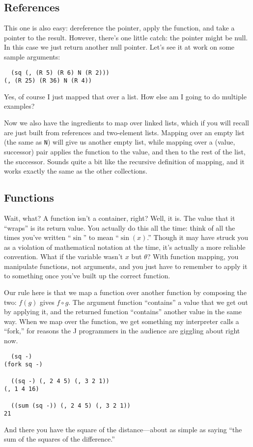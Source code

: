 \documentclass{article}
\newcommand{\code}[1]{\lstinline`#1`}
\begin{document}
\subsection{References}
This one is also easy: dereference the pointer, apply the function, and take a pointer to the result. However, there's one little catch: the pointer might be null. In this case we just return another null pointer. Let's see it at work on some sample arguments:
\begin{lstlisting}
  (sq (, (R 5) (R 6) N (R 2)))
(, (R 25) (R 36) N (R 4))
\end{lstlisting}
Yes, of course I just mapped that over a list. How else am I going to do multiple examples?

Now we also have the ingredients to map over linked lists, which if you will recall are just built from references and two-element lists. Mapping over an empty list (the same as \code{N}) will give us another empty list, while mapping over a (value, successor) pair applies the function to the value, and then to the rest of the list, the successor. Sounds quite a bit like the recursive definition of mapping, and it works exactly the same as the other collections.

\subsection{Functions}
Wait, what? A function isn't a container, right? Well, it is. The value that it ``wraps'' is its return value. You actually do this all the time: think of all the times you've written ``$\sin$'' to mean ``$\sin(x)$.'' Though it may have struck you as a violation of mathematical notation at the time, it's actually a more reliable convention. What if the variable wasn't $x$ but $\theta$? With function mapping, you manipulate functions, not arguments, and you just have to remember to apply it to something once you've built up the correct function.

Our rule here is that we map a function over another function by composing the two: $f(g)$ gives $f\circ g$. The argument function ``contains'' a value that we get out by applying it, and the returned function ``contains'' another value in the same way. When we map over the function, we get something my interpreter calls a ``fork,'' for reasons the J programmers in the audience are giggling about right now.
\begin{lstlisting}
  (sq -)
(fork sq -)

  ((sq -) (, 2 4 5) (, 3 2 1))
(, 1 4 16)

  ((sum (sq -)) (, 2 4 5) (, 3 2 1))
21
\end{lstlisting}
And there you have the square of the distance---about as simple as saying ``the sum of the squares of the difference.''
\end{document}
